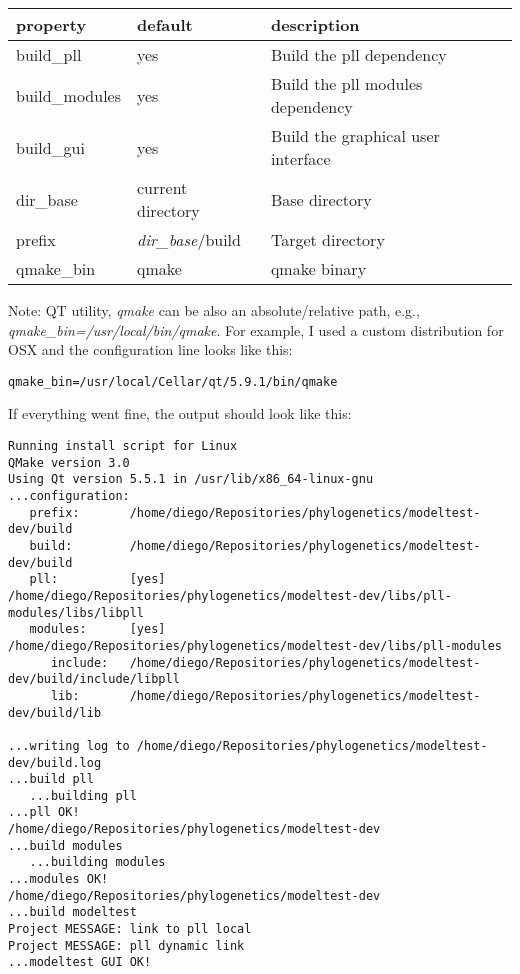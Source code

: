 \begin{tabular}{lll}
  {\bf property} & {\bf default} & {\bf description} \\
  \hline
  build\_pll & yes & Build the pll dependency \\
  build\_modules & yes & Build the pll modules dependency \\
  build\_gui & yes & Build the graphical user interface \\
  dir\_base & current directory & Base directory \\
  prefix & {\em dir\_base}/build & Target directory \\
  qmake\_bin & qmake & qmake binary \\
\end{tabular}
\vspace{1em}

Note: QT utility, {\em qmake} can be also an absolute/relative path, e.g., {\em qmake\_bin=/usr/local/bin/qmake}.
For example, I used a custom distribution for OSX and the configuration line looks like this:

\begin{lstlisting}
qmake_bin=/usr/local/Cellar/qt/5.9.1/bin/qmake
\end{lstlisting}

If everything went fine, the output should look like this:

\begin{lstlisting}
Running install script for Linux
QMake version 3.0
Using Qt version 5.5.1 in /usr/lib/x86_64-linux-gnu
...configuration:
   prefix:       /home/diego/Repositories/phylogenetics/modeltest-dev/build
   build:        /home/diego/Repositories/phylogenetics/modeltest-dev/build
   pll:          [yes] /home/diego/Repositories/phylogenetics/modeltest-dev/libs/pll-modules/libs/libpll
   modules:      [yes] /home/diego/Repositories/phylogenetics/modeltest-dev/libs/pll-modules
      include:   /home/diego/Repositories/phylogenetics/modeltest-dev/build/include/libpll
      lib:       /home/diego/Repositories/phylogenetics/modeltest-dev/build/lib

...writing log to /home/diego/Repositories/phylogenetics/modeltest-dev/build.log
...build pll
   ...building pll
...pll OK!
/home/diego/Repositories/phylogenetics/modeltest-dev
...build modules
   ...building modules
...modules OK!
/home/diego/Repositories/phylogenetics/modeltest-dev
...build modeltest
Project MESSAGE: link to pll local
Project MESSAGE: pll dynamic link
...modeltest GUI OK!
\end{lstlisting}

